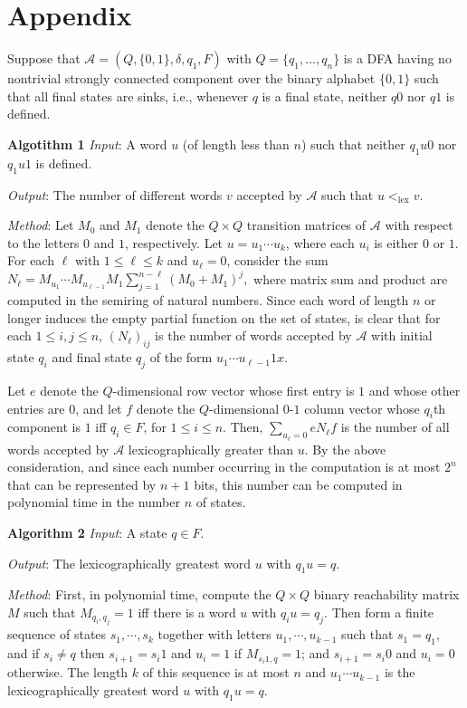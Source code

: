 \documentclass[copyright]{eptcs}
\newcommand{\cA}{\mathcal{A}}
\newcommand{\zo}{\{0,1\}}
\newcommand{\lex}{<_{\mathrm{lex}}}
\begin{document}
\section*{Appendix}




Suppose that $\cA = (Q,\zo,\delta,q_1,F)$ with $Q = \{q_1,\ldots,q_n\}$
is a DFA having no nontrivial strongly connected component over 
the binary alphabet $\zo$ such that all final states 
are sinks, i.e., whenever $q$ is a final state, neither $q0$ nor $q1$ 
is defined.


{\bf Algotithm 1} {\em Input}: A word $u$ (of length less than $n$) such that 
neither $q_1u0$ nor $q_1u1$ is defined. 

{\em Output}: The number of different words $v$ accepted by
$\cA$ such that $u \lex v$.

{\em Method}: 
Let $M_0$ and $M_1$ denote the $Q\times Q$ transition
matrices of $\cA$ with respect to the letters $0$ and $1$,
respectively. 
Let $u = u_1\cdots u_k$, where each $u_i$ is either $0$ or $1$.
For each $\ell$ with $1 \leq \ell \leq k$ and $u_\ell = 0$,
consider the sum
$N_\ell = M_{u_1}\cdots M_{u_{\ell -1}}M_1\sum_{j = 1}^{n -\ell}(M_0 + M_1)^j,$
where matrix sum and product are computed in the semiring of natural numbers. 
Since each word of length $n$ or longer induces the 
empty partial function on the set of states, is clear that for each $1 \leq i,j \leq n$, 
$(N_\ell)_{ij}$ is the number of words accepted by $\cA$ with 
initial state $q_i$ and final state $q_j$ of the form 
$u_1\cdots u_{\ell-1}1x$. 

Let $e$ denote the $Q$-dimensional row vector whose first entry is $1$
and whose other entries are $0$, and let $f$ denote the $Q$-dimensional 
$0$-$1$ column vector whose $q_i$th component is $1$ iff $q_i \in F$,
for $1 \leq i \leq n$.  
Then, $\sum_{u_\ell = 0} e N_\ell f$ is the number of all words 
accepted by $\cA$ lexicographically greater than $u$.
By the above consideration, and since each number 
occurring in the computation is at most $2^n$ that 
can be represented by $n+1$ bits, this number can be computed
in polynomial time in the number $n$ of states.



{\bf Algorithm 2}
{\em Input}:  A state $q \in F$.

{\em Output}: The lexicographically greatest word $u$ with $q_1u = q$.

{\em Method}: First, in polynomial time, compute the $Q \times Q$ 
binary reachability matrix $M$ such that $M_{q_i,q_j} = 1$ iff there is a word
$u$ with $q_iu = q_j$. Then form a finite sequence of states 
$s_1,\cdots,s_k$  together with letters $u_1,\cdots,u_{k-1}$
such that $s_1 = q_1$, and if $s_i \neq q$ then 
$s_{i+1} = s_i1$ and $u_i = 1$ if $M_{s_i1,q} = 1$; and $s_{i+1} = s_i0$ 
and $u_i = 0$ otherwise. 
The length $k$ of this sequence is at most $n$ 
and $u_1\cdots u_{k-1}$ is the lexicographically greatest word $u$ 
with $q_1u = q$.
\end{document}
